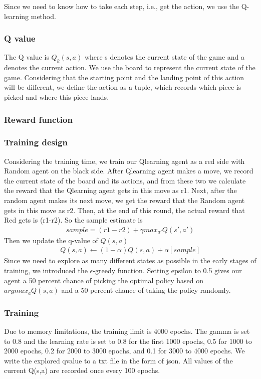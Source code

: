 Since we need to know how to take each step, i.e., get the action, we use the Q-learning method.
\subsubsection{Q value}
The Q value is $Q_{k}(s,a)$
where s denotes the current state of the game and a denotes the current action.
We use the board to represent the current state of the game. Considering that the 
starting point and the landing point of this action will be different, we define the 
action as a tuple, which records which piece is picked and where this piece lands.
\subsubsection{Reward function}

\subsubsection{Training design}
Considering the training time, we train our Qlearning agent as a red side with Random agent on the black side. 
After Qlearning agent makes a move, we record the current state of the board and its 
actions, and from these two we calculate the reward that the Qlearning agent gets in this move 
as r1. Next, after the random agent makes its next move, we get the reward 
that the Random agent gets in this move as r2. Then, at the end of this round, the actual 
reward that Red gets is (r1-r2). So the sample estimate is
\begin{align*}
    sample=(r1-r2)+\gamma max_{a'}Q(s',a')
\end{align*}
Then we update the q-value of $Q(s,a)$
\begin{align*}
    Q(s,a)\leftarrow (1-\alpha)Q(s,a)+\alpha [sample]
\end{align*}
Since we need to explore as many different states as possible in the early stages of training, 
we introduced the $\epsilon$-greedy function. Setting epsilon to 0.5 gives our agent a 50 percent chance of 
picking the optimal policy based on $argmax_{a}Q(s,a)$ and a 50 percent chance of taking the policy randomly.

\subsubsection{Training}
Due to memory limitations, the training limit is 4000 epochs. The gamma is set to 0.8 and the 
learning rate is set to 0.8 for the first 1000 epochs, 0.5 for 1000 to 2000 epochs, 0.2 for 2000 
to 3000 epochs, and 0.1 for 3000 to 4000 epochs.
We write the explored qvalue to a txt file in the form of json. All values of the current Q(s,a) are 
recorded once every 100 epochs.